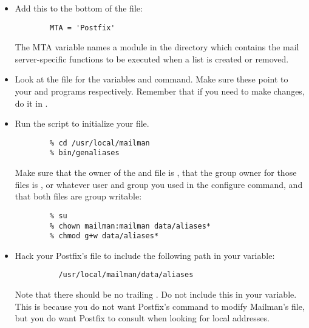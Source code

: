 \documentclass{howto}
\begin{document}
\begin{itemize}
\item Add this to the bottom of the 
      file:

      \begin{verbatim}
        MTA = 'Postfix'
      \end{verbatim}

      The MTA variable names a module in the  directory
      which contains the mail server-specific functions to be executed when a
      list is created or removed.

\item Look at the  file for the variables
       and  command.  Make sure
      these point to your  and  programs
      respectively.  Remember that if you need to make changes, do it in
      .

\item Run the  script to initialize your
       file.

      \begin{verbatim}
        % cd /usr/local/mailman
        % bin/genaliases
      \end{verbatim}

      Make sure that the owner of the  and
       file is , that the group owner
      for those files is , or whatever user and group you used
      in the configure command, and that both files are group writable:

      \begin{verbatim}
        % su
        % chown mailman:mailman data/aliases*
        % chmod g+w data/aliases*
      \end{verbatim}

\item Hack your Postfix's  file to include the following path in
      your  variable:

      \begin{verbatim}
          /usr/local/mailman/data/aliases
      \end{verbatim}

      Note that there should be no trailing .  Do not include this
      in your  variable.  This is because you do not want
      Postfix's  command to modify Mailman's
       file, but you do want Postfix to consult
       when looking for local addresses.


\end{itemize}
\end{document}
